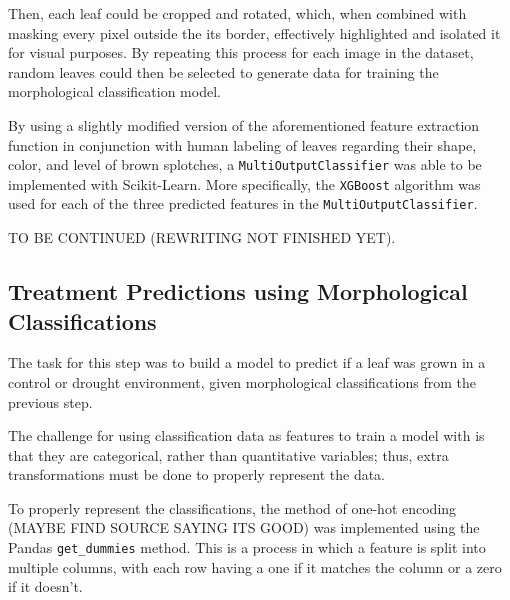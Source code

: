 \documentclass[final,5p,times,twocolumn,authoryear]{elsarticle}
\begin{document}
Then, each leaf could be cropped and rotated, which, when combined with masking every pixel outside the its border, effectively highlighted and isolated it for visual purposes. By repeating this process for each image in the dataset, random leaves could then be selected to generate data for training the morphological classification model.

By using a slightly modified version of the aforementioned feature extraction function in conjunction with human labeling of leaves regarding their shape, color, and level of brown splotches, a \verb|MultiOutputClassifier| was able to be implemented with Scikit-Learn. More specifically, the \verb|XGBoost| algorithm was used for each of the three predicted features in the \verb|MultiOutputClassifier|.

TO BE CONTINUED (REWRITING NOT FINISHED YET).

\subsection{Treatment Predictions using Morphological Classifications}
\label{step_3}

The task for this step was to build a model to predict if a leaf was grown in a control or drought environment, given morphological classifications from the previous step. 

The challenge for using classification data as features to train a model with is that they are categorical, rather than quantitative variables; thus, extra transformations must be done to properly represent the data.

To properly represent the classifications, the method of one-hot encoding (MAYBE FIND SOURCE SAYING ITS GOOD) was implemented using the Pandas \verb|get_dummies| method. This is a process in which a feature is split into multiple columns, with each row having a one if it matches the column or a zero if it doesn't. 

\begin{center}
\label{Table1}
\end{center}
\end{document}
